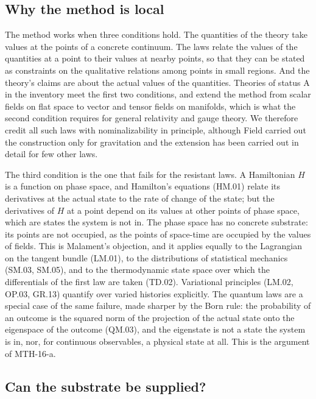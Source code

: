 \documentclass{situationist-preprint}
\begin{document}
\subsection{Why the method is local}

The method works when three conditions hold. The quantities of the theory take values at the points of a concrete continuum. The laws relate the values of the quantities at a point to their values at nearby points, so that they can be stated as constraints on the qualitative relations among points in small regions. And the theory's claims are about the actual values of the quantities. Theories of status A in the inventory meet the first two conditions, and \citet{ArntzeniusDorr2012} extend the method from scalar fields on flat space to vector and tensor fields on manifolds, which is what the second condition requires for general relativity and gauge theory. We therefore credit all such laws with nominalizability in principle, although Field carried out the construction only for gravitation and the extension has been carried out in detail for few other laws.

The third condition is the one that fails for the resistant laws. A Hamiltonian $H$ is a function on phase space, and Hamilton's equations (HM.01) relate its derivatives at the actual state to the rate of change of the state; but the derivatives of $H$ at a point depend on its values at other points of phase space, which are states the system is not in. The phase space has no concrete substrate: its points are not occupied, as the points of space-time are occupied by the values of fields. This is Malament's objection, and it applies equally to the Lagrangian on the tangent bundle (LM.01), to the distributions of statistical mechanics (SM.03, SM.05), and to the thermodynamic state space over which the differentials of the first law are taken (TD.02). Variational principles (LM.02, OP.03, GR.13) quantify over varied histories explicitly. The quantum laws are a special case of the same failure, made sharper by the Born rule: the probability of an outcome is the squared norm of the projection of the actual state onto the eigenspace of the outcome (QM.03), and the eigenstate is not a state the system is in, nor, for continuous observables, a physical state at all. This is the argument of MTH-16-a.

\subsection{Can the substrate be supplied?}
\end{document}
